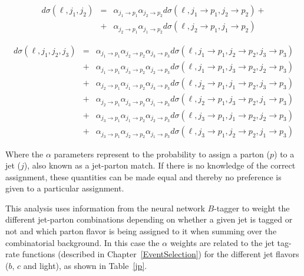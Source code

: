 \begin{eqnarray}
\label{pxcomb}
d\sigma(\ell, j_1, j_2)
&=& \alpha_{j_1 {\rightarrow} p_1} \alpha_{j_2 {\rightarrow} p_2}
    d\sigma(\ell, j_1 {\rightarrow} p_1, j_2 {\rightarrow} p_2) + \nonumber \\
&+& \alpha_{j_2 {\rightarrow} p_1} \alpha_{j_1 {\rightarrow} p_2}
    d\sigma(\ell, j_2 {\rightarrow} p_1, j_1 {\rightarrow} p_2) 
\end{eqnarray}

\begin{eqnarray}
\label{pxcomb3}
    \nonumber
d\sigma(\ell, j_1, j_2, j_3)
&=& \alpha_{j_1 {\rightarrow} p_1} \alpha_{j_2 {\rightarrow} p_2} \alpha_{j_3 {\rightarrow} p_3}
    d\sigma(\ell, j_1 {\rightarrow} p_1, j_2 {\rightarrow} p_2, j_3 {\rightarrow} p_3) \\
    \nonumber
&+& \alpha_{j_1 {\rightarrow} p_1} \alpha_{j_3 {\rightarrow} p_2} \alpha_{j_2 {\rightarrow} p_3}
    d\sigma(\ell, j_1 {\rightarrow} p_1, j_3 {\rightarrow} p_2, j_2 {\rightarrow} p_3) \\
    \nonumber
&+& \alpha_{j_2 {\rightarrow} p_1} \alpha_{j_1 {\rightarrow} p_2} \alpha_{j_3 {\rightarrow} p_3}
    d\sigma(\ell, j_2 {\rightarrow} p_1, j_1 {\rightarrow} p_2, j_3 {\rightarrow} p_3) \\
    \nonumber
&+& \alpha_{j_2 {\rightarrow} p_1} \alpha_{j_3 {\rightarrow} p_2} \alpha_{j_1 {\rightarrow} p_3}
    d\sigma(\ell, j_2 {\rightarrow} p_1, j_3 {\rightarrow} p_2, j_1 {\rightarrow} p_3) \\
    \nonumber
&+& \alpha_{j_3 {\rightarrow} p_1} \alpha_{j_1 {\rightarrow} p_2} \alpha_{j_2 {\rightarrow} p_3}
    d\sigma(\ell, j_3 {\rightarrow} p_1, j_1 {\rightarrow} p_2, j_2 {\rightarrow} p_3) \\
&+& \alpha_{j_3 {\rightarrow} p_1} \alpha_{j_2 {\rightarrow} p_2} \alpha_{j_1 {\rightarrow} p_3}
    d\sigma(\ell, j_3 {\rightarrow} p_1, j_2 {\rightarrow} p_2, j_1 {\rightarrow} p_3)
\end{eqnarray}


\noindent Where the $\alpha$ parameters represent to the probability to assign a parton ($p$) to a jet ($j$), also known as a jet-parton match. If there is no knowledge of the correct
assignment, these quantities can be made equal and thereby no preference is given to a particular assignment.

This analysis uses information from the neural network
$B$-tagger to weight the different jet-parton
combinations depending on whether a given jet is tagged or not and
which parton flavor is being assigned to it when summing over the
combinatorial background. In this case the $\alpha$ weights are related to the jet tag-rate functions (described in Chapter~\ref{EventSelection}) for the
different jet flavors ($b$, $c$ and light), as shown in
Table~\ref{jp}. 

